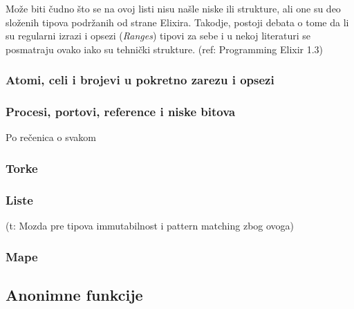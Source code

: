 \documentclass[a4paper]{article}
\begin{document}
Može biti čudno što se na ovoj listi nisu našle niske ili strukture, ali one su deo složenih tipova podržanih od strane Elixira. Takodje, postoji debata o tome da li su regularni izrazi i opsezi (\textit{Ranges}) tipovi za sebe i u nekoj literaturi se posmatraju ovako iako su tehnički strukture. (ref: Programming Elixir 1.3)

\subsubsection{Atomi, celi i brojevi u pokretno zarezu i opsezi}
\label{sec:ime}
\textit{}
\subsubsection{Procesi, portovi, reference i niske bitova}
\label{sec:ime}
Po rečenica o svakom
\subsubsection{Torke}
\label{sec:ime}

\subsubsection{Liste}
\label{sec:ime}
(t: Mozda pre tipova immutabilnost i pattern matching zbog ovoga)
\subsubsection{Mape}
\label{sec:ime}

\subsection{Anonimne funkcije}
\label{sec:ime}
\end{document}
